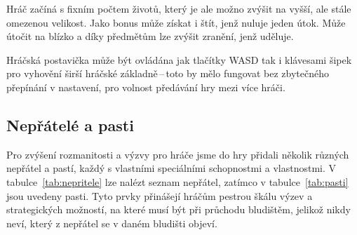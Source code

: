 Hráč začíná s fixním počtem životů, který je ale možno zvýšit na vyšší, ale stále omezenou velikost. Jako bonus může získat i štít, jenž nuluje jeden útok. Může útočit na blízko a díky předmětům lze zvýšit zranění, jenž uděluje.

Hráčská postavička může být ovládána jak tlačítky WASD tak i klávesami šipek pro vyhovění širší hráčské základně\,--\,toto by mělo fungovat bez zbytečného přepínání v nastavení, pro volnost předávání hry mezi více hráči.

\subsection*{Nepřátelé a pasti}
Pro zvýšení rozmanitosti a výzvy pro hráče jsme do hry přidali několik různých nepřátel a pastí, každý s vlastními speciálními schopnostmi a vlastnostmi. V tabulce~\ref{tab:nepritele} lze nalézt seznam nepřátel, zatímco v tabulce~\ref{tab:pasti} jsou uvedeny pasti. Tyto prvky přinášejí hráčům pestrou škálu výzev a strategických možností, na které musí být při průchodu bludištěm, jelikož nikdy neví, který z nepřátel se v daném bludišti objeví.

